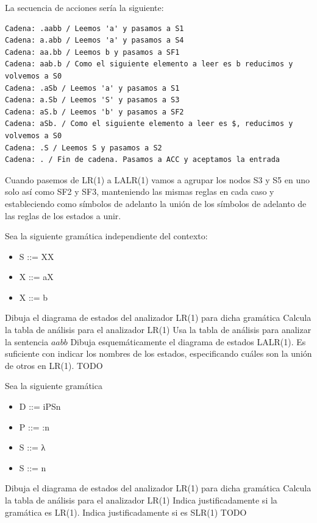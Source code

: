 \documentclass[nochap]{apuntes}
\begin{document}
\begin{problem}
\ppart
La secuencia de acciones sería la siguiente:
\begin{verbatim}
Cadena: .aabb / Leemos 'a' y pasamos a S1
Cadena: a.abb / Leemos 'a' y pasamos a S4
Cadena: aa.bb / Leemos b y pasamos a SF1
Cadena: aab.b / Como el siguiente elemento a leer es b reducimos y volvemos a S0
Cadena: .aSb / Leemos 'a' y pasamos a S1
Cadena: a.Sb / Leemos 'S' y pasamos a S3
Cadena: aS.b / Leemos 'b' y pasamos a SF2
Cadena: aSb. / Como el siguiente elemento a leer es $, reducimos y volvemos a S0
Cadena: .S / Leemos S y pasamos a S2
Cadena: . / Fin de cadena. Pasamos a ACC y aceptamos la entrada
\end{verbatim}

\ppart
Cuando pasemos de LR(1) a LALR(1) vamos a agrupar los nodos S3 y S5 en uno solo así como SF2 y SF3, manteniendo las mismas reglas en cada caso y estableciendo como símbolos de adelanto la unión de los símbolos de adelanto de las reglas de los estados a unir.
\end{problem}

\begin{problem}
Sea la siguiente gramática independiente del contexto:
\begin{itemize}
\item S ::= XX
\item X ::= aX
\item X ::= b
\end{itemize}
\ppart Dibuja el diagrama de estados del analizador LR(1) para dicha gramática
\ppart Calcula la tabla de análisis para el analizador LR(1)
\ppart Usa la tabla de análisis para analizar la sentencia $aabb$
\ppart Dibuja esquemáticamente el diagrama de estados LALR(1). Es suficiente con indicar los nombres de los estados, especificando cuáles son la unión de otros en LR(1).
\solution
TODO
\end{problem}

\begin{problem}
Sea la siguiente gramática

\begin{itemize}
\item D ::= iPSn
\item P ::= :n
\item S ::= λ
\item S ::= n
\end{itemize}

\ppart Dibuja el diagrama de estados del analizador LR(1) para dicha gramática
\ppart Calcula la tabla de análisis para el analizador LR(1)
\ppart Indica justificadamente si la gramática es LR(1). Indica justificadamente si es SLR(1)
\solution
TODO
\end{problem}
\end{document}
